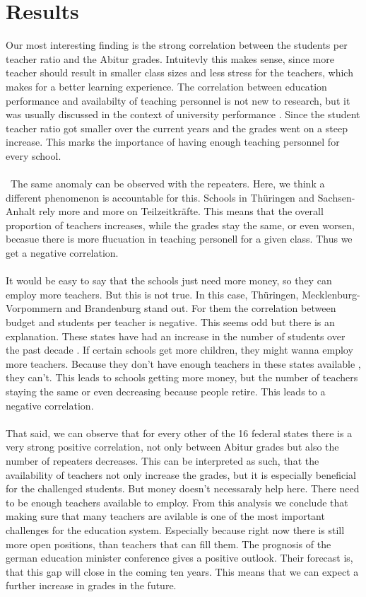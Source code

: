 \section*{Results}
Our most interesting finding is the strong correlation between the students per teacher ratio and the Abitur grades. Intuitevly this makes sense, since more teacher should result in smaller class sizes and less stress for the teachers, which makes for a better learning experience. The correlation between education performance and availabilty of teaching personnel is not new to research, but it was usually discussed in the context of university performance \cite{doi:10.1080/00220485.1984.10845072}. Since the student teacher ratio got smaller over the current years and the grades went on a steep increase. This marks the importance of having enough teaching personnel for every school.\\\\\
The same anomaly can be observed with the repeaters. Here, we think a different phenomenon is accountable for this. Schools in Thüringen and Sachsen-Anhalt rely more and more on Teilzeitkräfte. This means that the overall proportion of teachers increases, while the grades stay the same, or even worsen, becasue there is more flucuation in teaching personell for a given class. Thus we get a negative correlation.\\\\
It would be easy to say that the schools just need more money, so they can employ more teachers. But this is not true. In this case, Thüringen, Mecklenburg-Vorpommern and Brandenburg stand out. For them the correlation between budget and students per teacher is negative. This seems odd but there is an explanation. These states have had an increase in the number of students over the past decade \cite{Brandenburg}\cite{Sachsen} \cite{Mecklenburg}.  If certain schools get more children, they might wanna employ more teachers. Because they don't have enough teachers in these states available \cite{Kultusministerkonferenz}, they can't. This leads to schools getting more money, but the number of teachers staying the same or even decreasing because people retire. This leads to a negative correlation.\\\\
That said, we can observe that for every other of the 16 federal states there is a very strong positive correlation, not only between Abitur grades but also the number of repeaters decreases. This can be interpreted as such, that the availability of teachers not only increase the grades, but it is especially beneficial for the challenged students. But money doesn't necessaraly help here. There need to be enough teachers available to employ. From this analysis we conclude that making sure that many teachers are avilable is one of the most important challenges for the education system. Especially because right now there is still more open positions, than teachers that can fill them. The prognosis of the german education minister conference \cite{Kultusministerkonferenz} gives a positive outlook. Their forecast is, that this gap will close in the coming ten years. This means that we can expect a further increase in grades in the future.\\\\
